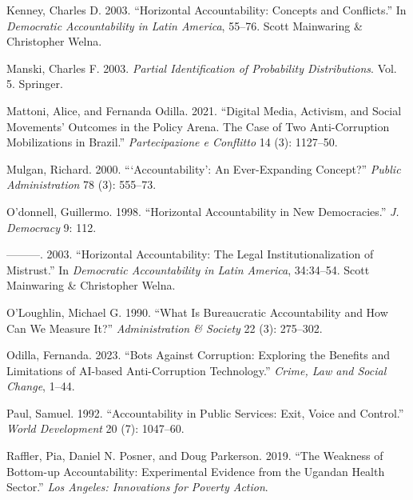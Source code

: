 \documentclass[]{AEA}
\newlength{\cslhangindent}
\newlength{\cslentryspacingunit} %
\newenvironment{CSLReferences}[2] %
 {%
  \setlength{\parindent}{0pt}
  \ifodd #1
  \let\oldpar\par
  \def\par{\hangindent=\cslhangindent\oldpar}
  \fi
  \setlength{\parskip}{#2\cslentryspacingunit}
 }%
 {}
\begin{document}
\begin{CSLReferences}{1}{0}
\leavevmode{}%
Kenney, Charles D. 2003. {``Horizontal Accountability: Concepts and
Conflicts.''} In \emph{Democratic {Accountability} in {Latin America}},
55--76. {Scott Mainwaring \& Christopher Welna}.

\leavevmode{}%
Manski, Charles F. 2003. \emph{Partial Identification of Probability
Distributions}. Vol. 5. {Springer}.

\leavevmode{}%
Mattoni, Alice, and Fernanda Odilla. 2021. {``Digital {Media},
{Activism}, and {Social Movements}' {Outcomes} in the {Policy Arena}.
{The Case} of {Two Anti-Corruption Mobilizations} in {Brazil}.''}
\emph{Partecipazione e Conflitto} 14 (3): 1127--50.

\leavevmode{}%
Mulgan, Richard. 2000. {``{`{Accountability}'}: An Ever-Expanding
Concept?''} \emph{Public Administration} 78 (3): 555--73.

\leavevmode{}%
O'donnell, Guillermo. 1998. {``Horizontal Accountability in New
Democracies.''} \emph{J. Democracy} 9: 112.

\leavevmode{}%
---------. 2003. {``Horizontal Accountability: {The} Legal
{Institutionalization} of {Mistrust}.''} In \emph{Democratic
{Accountability} in {Latin America}}, 34:34--54. {Scott Mainwaring \&
Christopher Welna}.

\leavevmode{}%
O'Loughlin, Michael G. 1990. {``What Is Bureaucratic Accountability and
How Can We Measure It?''} \emph{Administration \& Society} 22 (3):
275--302.

\leavevmode{}%
Odilla, Fernanda. 2023. {``Bots Against Corruption: {Exploring} the
Benefits and Limitations of {AI-based} Anti-Corruption Technology.''}
\emph{Crime, Law and Social Change}, 1--44.

\leavevmode{}%
Paul, Samuel. 1992. {``Accountability in Public Services: Exit, Voice
and Control.''} \emph{World Development} 20 (7): 1047--60.

\leavevmode{}%
Raffler, Pia, Daniel N. Posner, and Doug Parkerson. 2019. {``The
Weakness of Bottom-up Accountability: Experimental Evidence from the
{Ugandan} Health Sector.''} \emph{Los Angeles: Innovations for Poverty
Action}.


\end{CSLReferences}
\end{document}
